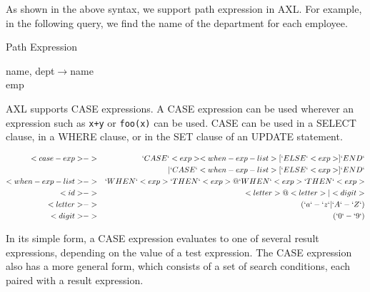 As shown in the above syntax, we support path expression in AXL. For
example, in the following query, we find the name of the department
for each employee.

\begin{example}{Path Expression}
\begin{codedisplay}
\> name, dept$\rightarrow$name \\
\> emp
\end{codedisplay}
\label{exe:refferencing}
\end{example}


AXL supports CASE expressions. A CASE expression can be used wherever
an expression such as {\tt x+y} or {\tt foo(x)} can be used. CASE can
be used in a SELECT clause, in a WHERE clause, or in the SET clause of
an UPDATE statement.

\begin{bnf}
  \begin{eqnarray*}
    <case-exp> &->& `CASE` <exp> <when-exp-list> [`ELSE` <exp>] `END`\\
    && | `CASE` <when-exp-list>  [`ELSE` <exp>] `END`\\
    <when-exp-list> &->& `WHEN` <exp> `THEN` <exp> {@ `WHEN` <exp> `THEN` <exp>}\\
    <id> &->& <letter> {@ <letter> | <digit>}\\
    <letter> &->& (`a`-`z`|`A`-`Z`)\\
    <digit> &->& (`0`-`9`)\\
  \end{eqnarray*}
\end{bnf}

In its simple form, a CASE expression evaluates
to one of several result expressions, depending on the value of a test
expression. The CASE expression also has a more general form, which
consists of a set of search conditions, each paired with a result
expression.

